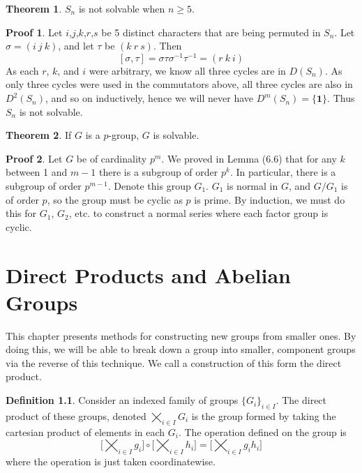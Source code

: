 \documentclass[12pt]{amsbook}
\theoremstyle{definition}
\newtheorem{theorem}{Theorem}[chapter]
\newtheorem{definition}{Definition}
\newtheorem*{prf}{Proof}
\begin{document}
\begin{theorem}
    $S_n$ is not solvable when $n \geq 5$.
\end{theorem}
\begin{prf}
    Let $i$,$j$,$k$,$r$,$s$ be 5 distinct characters that are being permuted in $S_n$. Let $\sigma = (i\ j\ k)$, and let $\tau$ be $(k\ r\ s)$. Then
    \[ [\sigma, \tau] = \sigma\tau\sigma^{-1}\tau^{-1} = (r\ k\ i) \]
    As each $r$, $k$, and $i$ were arbitrary, we know all three cycles are in $D(S_n)$. As only three cycles were used in the commutators above, all three cycles are also in $D^2(S_n)$, and so on inductively, hence we will never have $D^m(S_n) = \{ \mathbf{1} \}$. Thus $S_n$ is not solvable.
\end{prf}

\begin{theorem}
    If $G$ is a $p$-group, $G$ is solvable.
\end{theorem}
\begin{prf}
    Let $G$ be of cardinality $p^m$. We proved in Lemma (6.6) that for any $k$ between 1 and $m-1$ there is a subgroup of order $p^k$. In particular, there is a subgroup of order $p^{m-1}$. Denote this group $G_1$. $G_1$ is normal in $G$, and $G/G_1$ is of order $p$, so the group must be cyclic as $p$ is prime. By induction, we must do this for $G_1$, $G_2$, etc. to construct a normal series where each factor group is cyclic.
\end{prf}





\chapter{Direct Products and Abelian Groups}

This chapter presents methods for constructing new groups from smaller ones. By doing this, we will be able to break down a group into smaller, component groups via the reverse of this technique. We call a construction of this form the direct product.

\begin{definition}
Consider an indexed family of groups $\{ G_i \}_{i \in I}$. The direct product of these groups, denoted $\bigtimes_{i \in I} G_i$ is the group formed by taking the cartesian product of elements in each $G_i$. The operation defined on the group is
%
\[ \bigg[ \bigtimes_{i \in I} g_i \bigg] \circ \bigg[ \bigtimes_{i \in I} h_i \bigg] = \bigg[ \bigtimes_{i \in I} g_ih_i \bigg] \]
%
where the operation is just taken coordinatewise.
\end{definition}
\end{document}
